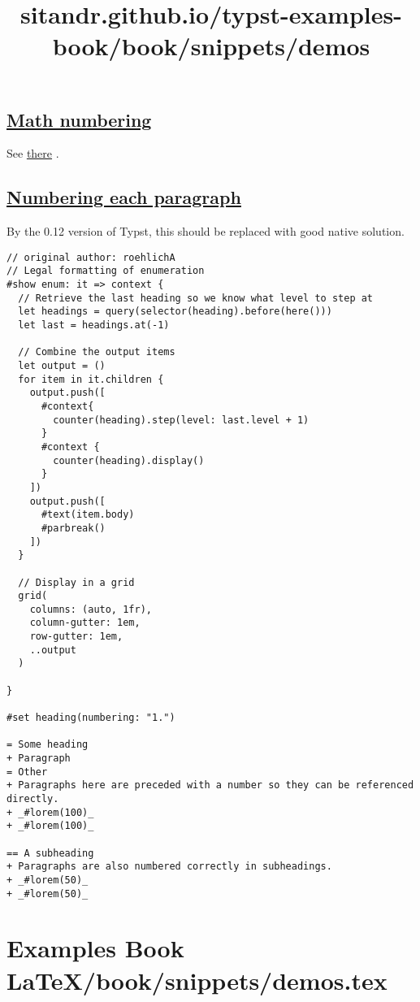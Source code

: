 \pandocbounded{}

\subsection{\texorpdfstring{\hyperref[math-numbering]{Math
numbering}}{Math numbering}}\label{math-numbering}

See \href{./math/numbering.html}{there} .

\subsection{\texorpdfstring{\hyperref[numbering-each-paragraph]{Numbering
each
paragraph}}{Numbering each paragraph}}\label{numbering-each-paragraph}

By the 0.12 version of Typst, this should be replaced with good native
solution.

\begin{verbatim}
// original author: roehlichA
// Legal formatting of enumeration
#show enum: it => context {
  // Retrieve the last heading so we know what level to step at
  let headings = query(selector(heading).before(here()))
  let last = headings.at(-1)

  // Combine the output items
  let output = ()
  for item in it.children {
    output.push([
      #context{
        counter(heading).step(level: last.level + 1)
      }
      #context {
        counter(heading).display() 
      }
    ])
    output.push([
      #text(item.body)
      #parbreak()
    ])
  }

  // Display in a grid
  grid(
    columns: (auto, 1fr),
    column-gutter: 1em,
    row-gutter: 1em,
    ..output
  )

}

#set heading(numbering: "1.")

= Some heading
+ Paragraph
= Other
+ Paragraphs here are preceded with a number so they can be referenced directly.
+ _#lorem(100)_
+ _#lorem(100)_

== A subheading
+ Paragraphs are also numbered correctly in subheadings.
+ _#lorem(50)_
+ _#lorem(50)_
\end{verbatim}

\pandocbounded{}


\section{Examples Book LaTeX/book/snippets/demos.tex}
\title{sitandr.github.io/typst-examples-book/book/snippets/demos}

